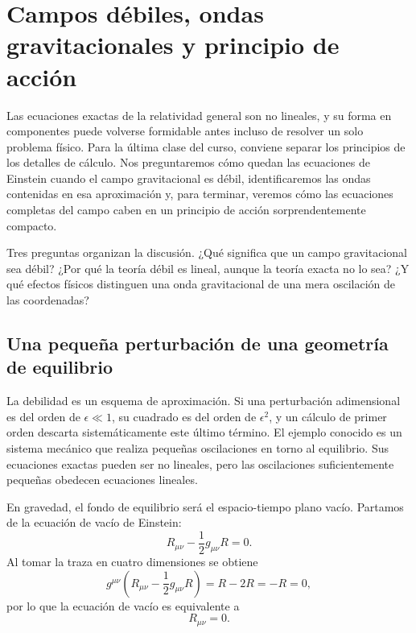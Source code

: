 \chapter{Campos débiles, ondas gravitacionales y principio de acción}

Las ecuaciones exactas de la relatividad general son no lineales, y su forma en componentes puede volverse formidable antes incluso de resolver un solo problema físico. Para la última clase del curso, conviene separar los principios de los detalles de cálculo. Nos preguntaremos cómo quedan las ecuaciones de Einstein cuando el campo gravitacional es débil, identificaremos las ondas contenidas en esa aproximación y, para terminar, veremos cómo las ecuaciones completas del campo caben en un principio de acción sorprendentemente compacto.

Tres preguntas organizan la discusión. ¿Qué significa que un campo gravitacional sea débil? ¿Por qué la teoría débil es lineal, aunque la teoría exacta no lo sea? ¿Y qué efectos físicos distinguen una onda gravitacional de una mera oscilación de las coordenadas?

\section{Una pequeña perturbación de una geometría de equilibrio}

La debilidad es un esquema de aproximación. Si una perturbación adimensional es del orden de \(\epsilon\ll1\), su cuadrado es del orden de \(\epsilon^2\), y un cálculo de primer orden descarta sistemáticamente este último término. El ejemplo conocido es un sistema mecánico que realiza pequeñas oscilaciones en torno al equilibrio. Sus ecuaciones exactas pueden ser no lineales, pero las oscilaciones suficientemente pequeñas obedecen ecuaciones lineales.

En gravedad, el fondo de equilibrio será el espacio-tiempo plano vacío. Partamos de la ecuación de vacío de Einstein:
\begin{equation}
 R_{\mu\nu}-\frac12 g_{\mu\nu}R=0.
 \label{eq:l10-vacuum-einstein}
\end{equation}
Al tomar la traza en cuatro dimensiones se obtiene
\begin{equation}
 g^{\mu\nu}
 \left(R_{\mu\nu}-\frac12 g_{\mu\nu}R\right)
 =R-2R=-R=0,
\end{equation}
por lo que la ecuación de vacío es equivalente a
\begin{equation}
 R_{\mu\nu}=0.
 \label{eq:l10-ricci-flat}
\end{equation}

